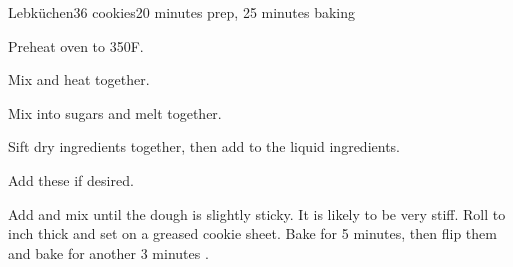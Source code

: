 \documentclass[../Cookbook.tex]{subfiles}
\begin{document}
\begin{recipe}{Lebk\"uchen}{36 cookies}{20 minutes prep, 25 minutes baking}

	Preheat oven to 350\0F.

	Mix and heat together.

	Mix into sugars and melt together.

	Sift dry ingredients together, then add to the liquid ingredients.

	Add these if desired.

	Add and mix until the dough is slightly sticky. It is likely to be very stiff. Roll to  inch thick and set on a greased cookie sheet. Bake for
	5 minutes, then flip them and bake for another 3 minutes
	.

\end{recipe}
\end{document}
